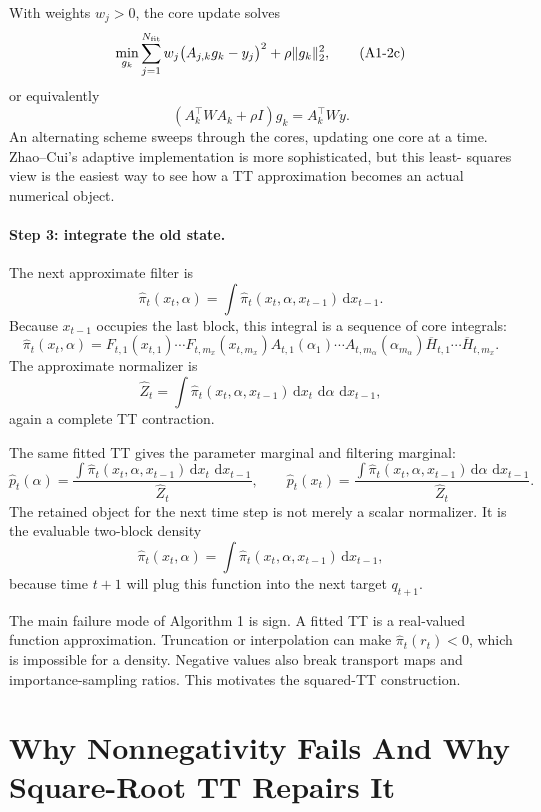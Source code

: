 \documentclass[11pt]{article}
\newcommand{\dd}{\,\mathrm d}
\begin{document}
With weights \(w_j>0\), the core update solves
\[
    \min_{g_k}
    \sum_{j=1}^{N_{\rm fit}}w_j\bigl(A_{j,k}g_k-y_j\bigr)^2
    +\rho\|g_k\|_2^2,
    \tag{A1-2c}
\]
or equivalently
\[
    (A_k^\top W A_k+\rho I)g_k=A_k^\top Wy.
    \tag{A1-2d}
\]
An alternating scheme sweeps through the cores, updating one core at a time.
Zhao--Cui's adaptive implementation is more sophisticated, but this least-
squares view is the easiest way to see how a TT approximation becomes an
actual numerical object.

\paragraph{Step 3: integrate the old state.}
The next approximate filter is
\[
    \widehat\pi_t(x_t,\alpha)
    =
    \int \widehat\pi_t(x_t,\alpha,x_{t-1})\dd x_{t-1}.
    \tag{A1-3}
\]
Because \(x_{t-1}\) occupies the last block, this integral is a sequence of core
integrals:
\[
    \widehat\pi_t(x_t,\alpha)
    =
    F_{t,1}(x_{t,1})\cdots F_{t,m_x}(x_{t,m_x})
    A_{t,1}(\alpha_1)\cdots A_{t,m_\alpha}(\alpha_{m_\alpha})
    \overline H_{t,1}\cdots \overline H_{t,m_x}.
    \tag{A1-4}
\]
The approximate normalizer is
\[
    \widehat Z_t
    =
    \int \widehat\pi_t(x_t,\alpha,x_{t-1})
    \dd x_t\,\dd\alpha\,\dd x_{t-1},
    \tag{A1-5}
\]
again a complete TT contraction.

The same fitted TT gives the parameter marginal and filtering marginal:
\[
    \widehat p_t(\alpha)
    =
    \frac{\int\widehat\pi_t(x_t,\alpha,x_{t-1})
    \dd x_t\,\dd x_{t-1}}
    {\widehat Z_t},
    \qquad
    \widehat p_t(x_t)
    =
    \frac{\int\widehat\pi_t(x_t,\alpha,x_{t-1})
    \dd\alpha\,\dd x_{t-1}}
    {\widehat Z_t}.
    \tag{A1-6}
\]
The retained object for the next time step is not merely a scalar
normalizer.  It is the evaluable two-block density
\[
    \widehat\pi_t(x_t,\alpha)
    =
    \int\widehat\pi_t(x_t,\alpha,x_{t-1})\dd x_{t-1},
    \tag{A1-7}
\]
because time \(t+1\) will plug this function into the next target
\(q_{t+1}\).

The main failure mode of Algorithm 1 is sign.  A fitted TT is a real-valued
function approximation.  Truncation or interpolation can make
\(\widehat\pi_t(r_t)<0\), which is impossible for a density.  Negative values
also break transport maps and importance-sampling ratios.  This motivates the
squared-TT construction.

\section{Why Nonnegativity Fails And Why Square-Root TT Repairs It}
\end{document}
